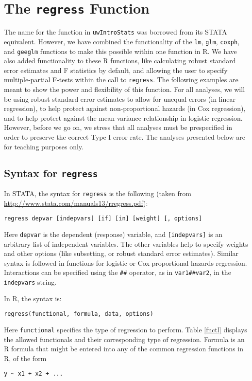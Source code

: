 \documentclass[11pt,letterpaper,fleqn]{report}
\begin{document}
\chapter{The \texttt{regress} Function}
The name for the function in \texttt{uwIntroStats} was borrowed from its STATA equivalent. However, we have combined the functionality of the \texttt{lm}, \texttt{glm}, \texttt{coxph}, and \texttt{geeglm} functions to make this possible within one function in R. We have also added functionality to these R functions, like calculating robust standard error estimates and F statistics by default, and allowing the user to specify multiple-partial F-tests within the call to \texttt{regress}. The following examples are meant to show the power and flexibility of this function. For all analyses, we will be using robust standard error estimates to allow for unequal errors (in linear regression), to help protect against non-proportional hazards (in Cox regression), and to help protect against the mean-variance relationship in logistic regression. However, before we go on, we stress that all analyses must be prespecified in order to preserve the correct Type I error rate. The analyses presented below are for teaching purposes only.

\FloatBarrier
\section{Syntax for \texttt{regress}}
In STATA, the syntax for \texttt{regress} is the following (taken from \url{http://www.stata.com/manuals13/rregress.pdf}):
\begin{verbatim}
regress depvar [indepvars] [if] [in] [weight] [, options]
\end{verbatim}

Here \texttt{depvar} is the dependent (response) variable, and \texttt{[indepvars]} is an arbitrary list of independent variables. The other variables help to specify weights and other options (like subsetting, or robust standard error estimates). Similar syntax is followed in functions for logistic or Cox proportional hazards regression. Interactions can be specified using the \texttt{\#\#} operator, as in \texttt{var1\#\#var2}, in the \texttt{indepvars} string.

In R, the syntax is:
\begin{verbatim}
regress(functional, formula, data, options)
\end{verbatim}

Here \texttt{functional} specifies the type of regression to perform. Table \ref{fnctl} displays the allowed functionals and their corresponding type of regression. Formula is an R formula that might be entered into any of the common regression functions in R, of the form
\begin{verbatim}
y ~ x1 + x2 + ...
\end{verbatim}
\end{document}
